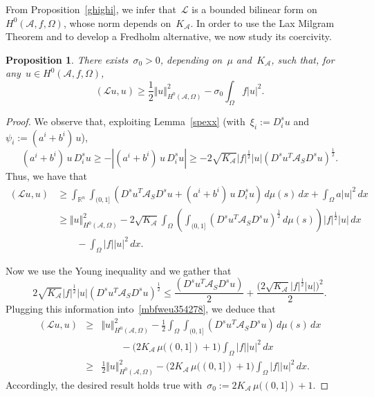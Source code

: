 \documentclass[11pt,hyp,]{nyjm}
\numberwithin{equation}{section}
\newcommand{\R}{\mathbb{R}}
\newtheorem{proposition}[theorem]{Proposition}
\theoremstyle{remark}
\newcommand{\ml}{\mathcal{L}}
\newcommand{\am}{\mathcal{A}}
\renewcommand{\leq}{\leqslant}
\renewcommand{\geq}{\geqslant}
\renewcommand{\ge}{\geqslant}
\begin{document}
			{F}rom Proposition~\ref{ghighi}, we infer that~$\mathcal{L}$ is a bounded bilinear form on $H^0(\am, f, \Omega)$, whose norm depends on~$K_{\am}$. In order to use the Lax Milgram Theorem and to develop a Fredholm alternative, we now study its coercivity.
			
\begin{proposition}\label{ghi}
There exists~$\sigma_0>0$, depending on~$\mu$ and~$K_{\am}$, such that, for any~$u \in H^0(\mathcal{A}, f, \Omega)$,
\begin{equation}\label{rds}
(\ml u,u) \geq \frac{1}{2} \Vert u \Vert^2_{H^0(\mathcal{A},\Omega)} - \sigma_0 \int_{\Omega} f |u|^2 .   
\end{equation}        
\end{proposition}
			
\begin{proof}  
We observe that, exploiting Lemma~\ref{spexx} (with~$\xi_i:=D^s_iu$ and~$\psi_i:=(a^i+b^i)\,u$),
\begin{equation*}
(a^i+b^i) \,u\, D^s_iu  \geq - |(a^i+b^i) \,u\,D^s_i u| \geq -2 \sqrt{K_{\am}}        
|f|^{\frac{1}{2}} |u| (D^su^T \mathcal{A}_S D^su)^{\frac{1}{2}}.       
\end{equation*}
Thus, we have that
\begin{equation}\label{mbfweu354278}\begin{split}
(\ml u, u) &\geq \int_{\R^n}  \int_{(0,1]}\left(  D^su^T \mathcal{A}_S D^su 
+ (a^i + b^i) \,u\,D^s_i u\right) \, d\mu(s) \,dx +\int_\Omega a |u|^2\, dx
\\&\geq\Vert u \Vert^2_{H^0(\mathcal{A},\Omega)} -2 \sqrt{K_{\am}} \int_{\Omega} \left( \int_{(0,1]} (D^su^T \mathcal{A}_S D^su)^{\frac{1}{2}} \, d\mu (s)\right) |f|^{\frac{1}{2}} |u| \, dx\\&\qquad-\int_\Omega |f| |u|^2\,dx.
				\end{split}\end{equation}
	
Now we use the Young inequality and we gather that
\[ 2 \sqrt{K_{\am}} |f|^{\frac{1}{2}} |u| (D^su^T \mathcal{A}_S D^su)^{\frac{1}{2}} \leq \frac{(D^su^T \mathcal{A}_S D^su)}{2}+ \frac{\big(
2 \sqrt{K_{\am}} |f|^{\frac{1}{2}} |u|\big)^2}{2}.\]
Plugging this information into~\eqref{mbfweu354278}, we deduce that
\begin{eqnarray*}
(\ml u, u) 
&\ge &\Vert u \Vert^2_{H^0(\mathcal{A},\Omega)} -\frac12
\int_{\Omega} \int_{(0,1]} (D^su^T \mathcal{A}_S D^su) \, d\mu (s)\, dx\\&&\qquad
-\big(2K_{\mathcal{A}}\,\mu((0,1])+1\big)\int_\Omega |f| |u|^2\,dx
\\
&\geq &
\frac{1}{2} \Vert u \Vert^2_{H^0(\mathcal{A},\Omega)} -\big(2K_{\mathcal{A}}\,\mu((0,1])+1\big) \int_{\Omega} |f| |u|^2 \, dx.
				\end{eqnarray*}
Accordingly, the desired result holds true with~$ \sigma_0:=2K_{\mathcal{A}}\,\mu((0,1])+1$.
			\end{proof}
			
\end{document}

